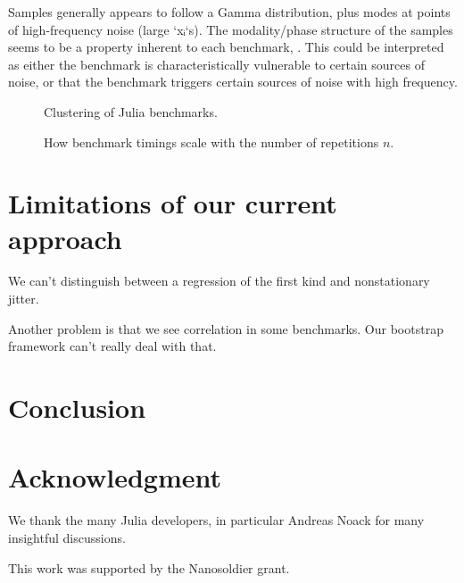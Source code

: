 \documentclass[conference]{IEEEtran}
\begin{document}
Samples generally appears to follow a Gamma distribution, plus modes at points of high-frequency noise (large `xᵢ`s). The modality/phase structure of the samples seems to be a property inherent to each benchmark, . This could be interpreted as either the benchmark is characteristically vulnerable to certain sources of noise, or that the benchmark triggers certain sources of noise with high frequency.


\begin{figure}[!t]
\centering
{}
\caption{Clustering of Julia benchmarks.}
\label{fig:benchclusters}
\end{figure}

\begin{figure}[!t]
\centering
{}
\caption{How benchmark timings scale with the number of repetitions $n$.}
\label{fig:scaling}
\end{figure}


\section{Limitations of our current approach}

We can't distinguish between a regression of the first kind and nonstationary jitter.

Another problem is that we see correlation in some benchmarks. Our bootstrap framework can't really deal with that.


\section{Conclusion}




\section*{Acknowledgment}

We thank the many Julia developers, in particular Andreas Noack for many insightful discussions.

This work was supported by the Nanosoldier grant.




\end{document}
